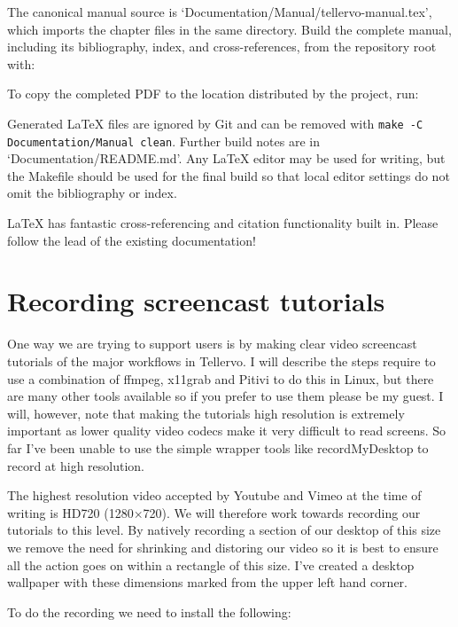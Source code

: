 The canonical manual source is `Documentation/Manual/tellervo-manual.tex',
which imports the chapter files in the same directory. Build the complete
manual, including its bibliography, index, and cross-references, from the
repository root with:


To copy the completed PDF to the location distributed by the project, run:


Generated {\LaTeX} files are ignored by Git and can be removed with
\verb|make -C Documentation/Manual clean|. Further build notes are in
`Documentation/README.md'. Any {\LaTeX} editor may be used for writing, but the
Makefile should be used for the final build so that local editor settings do not
omit the bibliography or index.

{\LaTeX} has fantastic cross-referencing and citation functionality built in.  Please follow the lead of the existing documentation!

\section{Recording screencast tutorials}
One way we are trying to support users is by making clear video screencast tutorials of the major workflows in Tellervo.  I will describe the steps require to use a combination of ffmpeg, x11grab and Pitivi to do this in Linux, but there are many other tools available so if you prefer to use them please be my guest.  I will, however, note that making the tutorials high resolution is extremely important as lower quality video codecs make it very difficult to read screens.  So far I've been unable to use the simple wrapper tools like recordMyDesktop to record at high resolution.

The highest resolution video accepted by Youtube and Vimeo at the time of writing is HD720 (1280$\times$720).  We will therefore work towards recording our tutorials to this level.  By natively recording a section of our desktop of this size we remove the need for shrinking and distoring our video so it is best to ensure all the action goes on within a rectangle of this size.  I've created a desktop wallpaper with these dimensions marked from the upper left hand corner.  

To do the recording we need to install the following:




